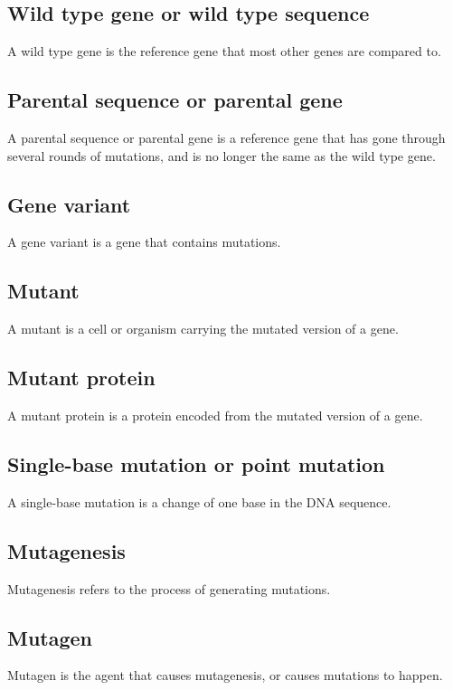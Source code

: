 \documentclass[11pt]{article}
\begin{document}
\subsection{Wild type gene or wild type sequence}
\label{sec:org2618205}
A wild type gene is the reference gene that most other genes are compared to.

\subsection{Parental sequence or parental gene}
\label{sec:org9fff507}
A parental sequence or parental gene is a reference gene that has gone through several rounds of mutations, and is no longer the same as the wild type gene.

\subsection{Gene variant}
\label{sec:org646d65b}
A gene variant is a gene that contains mutations.

\subsection{Mutant}
\label{sec:org55a688e}
A mutant is a cell or organism carrying the mutated version of a gene.

\subsection{Mutant protein}
\label{sec:org6f8ef9d}
A mutant protein is a protein encoded from the mutated version of a gene.

\subsection{Single-base mutation or point mutation}
\label{sec:org2482da2}
A single-base mutation is a change of one base in the DNA sequence.

\subsection{Mutagenesis}
\label{sec:org1312f54}
Mutagenesis refers to the process of generating mutations.

\subsection{Mutagen}
\label{sec:org579386a}
Mutagen is the agent that causes mutagenesis, or causes mutations to happen.
\end{document}
